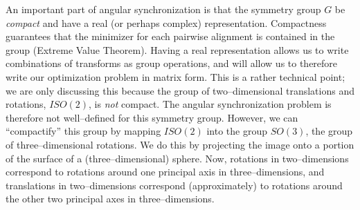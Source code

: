 \documentclass[12pt]{article}
\begin{document}
An important part of angular synchronization is that the symmetry group $G$ be {\em compact} and have a real (or perhaps complex) representation.
%
Compactness guarantees that the minimizer for each pairwise alignment is contained in the group (Extreme Value Theorem). 
%
Having a real representation allows us to write combinations of transforms as group operations, and will allow us to therefore write our optimization problem in matrix form. 
%
This is a rather technical point;
we are only discussing this because the group of two--dimensional translations and rotations, $ISO(2)$, is {\em not} compact.
%
The angular synchronization problem is therefore not well--defined for this symmetry group.
%
However, we can ``compactify'' this group by mapping $ISO(2)$ into the group $SO(3)$, the group of three--dimensional rotations.
%
We do this by projecting the image onto a portion of the surface of a (three--dimensional) sphere.
%
Now, rotations in two--dimensions correspond to rotations around one principal axis in three--dimensions, and translations in two--dimensions correspond (approximately) to rotations around the other two principal axes in three--dimensions.
\end{document}
